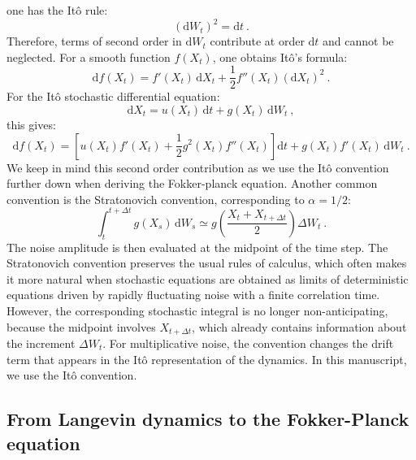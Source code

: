one has the Itô rule:
\begin{equation}
    (\mathrm{d}W_t)^2 = \mathrm{d}t~.
\end{equation}
Therefore, terms of second order in $\mathrm{d}W_t$ contribute at order $\mathrm{d}t$ and cannot be neglected. For a smooth function $f(X_t)$, one obtains Itô's formula:
\begin{equation}
    \mathrm{d}f(X_t)=f'(X_t)\,\mathrm{d}X_t+\dfrac{1}{2}f''(X_t)(\mathrm{d}X_t)^2~.
\end{equation}
For the Itô stochastic differential equation:
\begin{equation}
    \mathrm{d}X_t = u(X_t)\,\mathrm{d}t + g(X_t)\,\mathrm{d}W_t~,
\end{equation}
this gives:
\begin{equation}
    \mathrm{d}f(X_t)=\left[
        u(X_t)f'(X_t)+\dfrac{1}{2}g^2(X_t)f''(X_t)
    \right]\mathrm{d}t+g(X_t)f'(X_t)\,\mathrm{d}W_t~.
\end{equation}
We keep in mind this second order contribution as we use the Itô convention further down when deriving the Fokker-planck equation. Another common convention is the Stratonovich convention, corresponding to $\alpha=1/2$:
\begin{equation}
    \int_t^{t+\Delta t} g(X_s)\,\mathrm{d}W_s\simeq g\left(\dfrac{X_t+X_{t+\Delta t}}{2}\right)\Delta W_t~.
\end{equation}
The noise amplitude is then evaluated at the midpoint of the time step. The Stratonovich convention preserves the usual rules of calculus, which often makes it more natural when stochastic equations are obtained as limits of deterministic equations driven by rapidly fluctuating noise with a finite correlation time. However, the corresponding stochastic integral is no longer non-anticipating, because the midpoint involves $X_{t+\Delta t}$, which already contains information about the increment $\Delta W_t$. For multiplicative noise, the convention changes the drift term that appears in the Itô representation of the dynamics. In this manuscript, we use the Itô convention.

\subsection{From Langevin dynamics to the Fokker-Planck equation}

